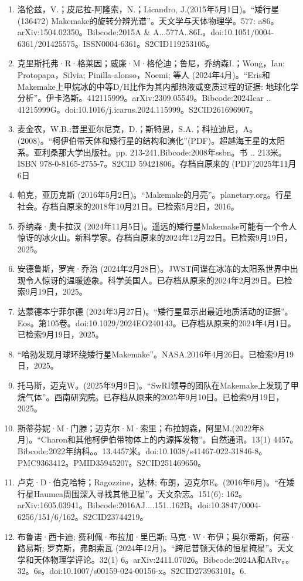 \begin{enumerate}
\item 洛伦兹，V.；皮尼拉-阿隆索，N.；Licandro, J.(2015年5月1日)。“矮行星 (136472) Makemake的旋转分辨光谱”。天文学与天体物理学。577: a86。arXiv:1504.02350。Bibcode:2015A & A...577A..86L。doi:10.1051/0004-6361/201425575。ISSN0004-6361。S2CID119253105。  
\item 克里斯托弗·R·格莱因；威廉·M·格伦迪；鲁尼，乔纳森I.；Wong，Ian; Protopapa，Silvia; Pinilla-alonso，Noemi; 等人 (2024年4月)。“Eris和Makemake上甲烷冰的中等D/H比作为其内部热液或变质过程的证据: 地球化学分析”。伊卡洛斯。412115999。arXiv:2309.05549。Bibcode:2024Icar .. 41215999G。doi:10.1016/j.icarus.2024.115999。S2CID261696907。 
\item 麦金农，W.B.;普里亚尔尼克，D.；斯特恩，S.A.；科拉迪尼，A。(2008)。“柯伊伯带天体和矮行星的结构和演化”(PDF)。超越海王星的太阳系。亚利桑那大学出版社。pp. 213-241.Bibcode:2008年ssbn。书 .. 213米。ISBN  978-0-8165-2755-7。S2CID 59421806。存档自原来的 (PDF)2025年11月6日
\item 帕克，亚历克斯 (2016年5月2日)。“Makemake的月亮”。planetary.org。行星社会。存档自原来的2018年10月21日。已检索5月2日，2016。
\item 乔纳森·奥卡拉汉 (2024年11月5日)。遥远的矮行星Makemake可能有一个令人惊讶的冰火山。新科学家。存档自原来的2024年12月22日。已检索9月19日，2025。
\item 安德鲁斯，罗宾·乔治 (2024年2月28日)。JWST间谍在冰冻的太阳系世界中出现令人惊讶的温暖迹象。科学美国人。已存档从原来的2024年2月29日。已检索9月19日，2025。
\item 达蒙德本宁菲尔德 (2024年3月27日)。“矮行星显示出最近地质活动的证据”。Eos。第105卷。doi:10.1029/2024EO240143。已存档从原来的2024年4月1日。已检索9月19日，2025。
\item “哈勃发现月球环绕矮行星Makemake”。NASA.2016年4月26日。已检索9月19日，2025。
\item 托马斯，迈克W。(2025年9月9日)。“SwRI领导的团队在Makemake上发现了甲烷气体”。西南研究院。已存档从原来的2025年9月10日。已检索9月19日，2025。
\item 斯蒂芬妮·M·门滕；迈克尔·M·索里；布拉姆森，阿里M.(2022年8月)。“Charon和其他柯伊伯带物体上的内源挥发物”。自然通讯。13(1) 4457。Bibcode:2022年纳科。。13.4457米。doi:10.1038/s41467-022-31846-8。PMC9363412。PMID35945207。S2CID251469650。   
\item 卢克·D·伯克哈特；Ragozzine，达林; 布朗，迈克尔E。(2016年6月)。“在矮行星Haumea周围深入寻找其他卫星”。天文杂志。151(6): 162。arXiv:1605.03941。Bibcode:2016AJ....151..162B。doi:10.3847/0004-6256/151/6/162。S2CID23744219。 
\item 布鲁诺·西卡迪; 费利佩·布拉加·里巴斯; 马克·W·布伊；奥尔蒂斯，何塞·路易斯; 罗克斯，弗朗索瓦 (2024年12月)。“跨尼普顿天体的恒星掩星”。天文学和天体物理学评论。32(1) 6。arXiv:2411.07026。Bibcode:2024A和ARv。。32。6s。doi:10.1007/s00159-024-00156-x。S2CID273963101。6. 

\end{enumerate}
